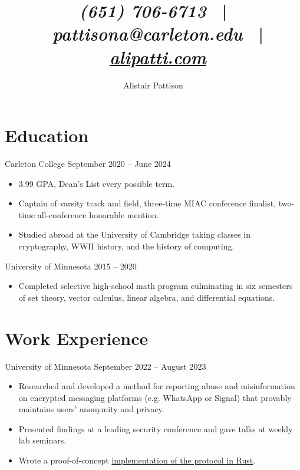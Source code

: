 \documentclass{ali-resume}
\author{Alistair Pattison}
\title{
{\it (651) 706-6713}
\ | \
{\it pattisona@carleton.edu}
\ | \
\href{http://alipatti.com}{\it alipatti.com}
}
\begin{document}
\maketitle

\section{Education}

{Carleton College}
{September 2020 -- June 2024}

\begin{itemize}
	\item 3.99 GPA, Dean's List every possible term.
	\item Captain of varsity track and field, three-time MIAC conference finalist, two-time all-conference honorable mention.
	\item Studied abroad at the University of Cambridge taking classes in cryptography, WWII history, and the history of computing.
\end{itemize}

{University of Minnesota}
{2015 -- 2020}

\begin{itemize}
	\item Completed selective high-school math program culminating in six semesters of set theory, vector calculus, linear algebra, and differential equations.
\end{itemize}

\section{Work Experience}



{University of Minnesota}
{September 2022 -- August 2023}

\begin{itemize}
	\item Researched and developed a method for reporting abuse and misinformation on encrypted messaging platforms (e.g. WhatsApp or Signal) that provably maintains users' anonymity and privacy.
	\item Presented findings at a leading security conference and gave talks at weekly lab seminars.
	\item Wrote a proof-of-concept \href{http://github.com/alipatti/cerberus}{implementation of the protocol in Rust}.
\end{itemize}
\end{document}
